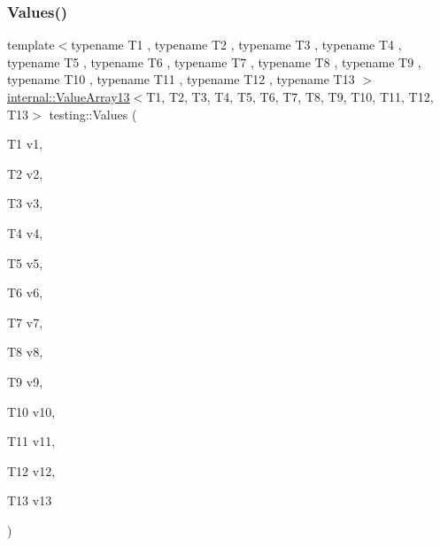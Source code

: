\subsubsection{\texorpdfstring{Values()}{Values()}\hspace{0.1cm}{\footnotesize\ttfamily [14/51]}}
{\footnotesize\ttfamily template$<$typename T1 , typename T2 , typename T3 , typename T4 , typename T5 , typename T6 , typename T7 , typename T8 , typename T9 , typename T10 , typename T11 , typename T12 , typename T13 $>$ \\
\mbox{\hyperlink{classtesting_1_1internal_1_1_value_array13}{internal\+::\+Value\+Array13}}$<$T1, T2, T3, T4, T5, T6, T7, T8, T9, T10, T11, T12, T13$>$ testing\+::\+Values (\begin{DoxyParamCaption}\item[{T1}]{v1,  }\item[{T2}]{v2,  }\item[{T3}]{v3,  }\item[{T4}]{v4,  }\item[{T5}]{v5,  }\item[{T6}]{v6,  }\item[{T7}]{v7,  }\item[{T8}]{v8,  }\item[{T9}]{v9,  }\item[{T10}]{v10,  }\item[{T11}]{v11,  }\item[{T12}]{v12,  }\item[{T13}]{v13 }\end{DoxyParamCaption})}

\mbox{\label{namespacetesting_a2d00ed785e0e796e6f36dc79c051dc76}} 
